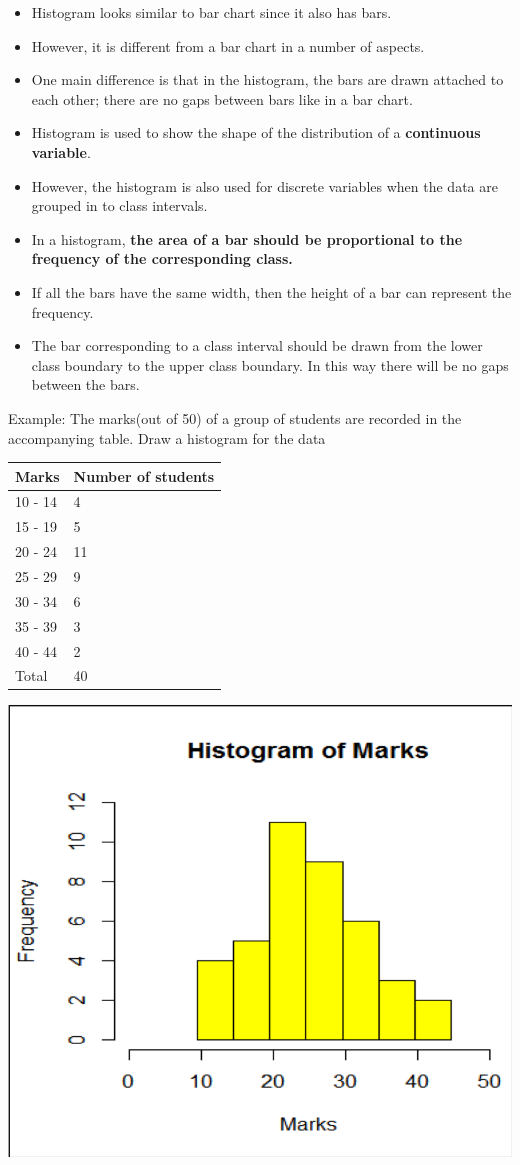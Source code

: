 \documentclass[]{book}
\providecommand{\tightlist}{%
  \setlength{\itemsep}{0pt}\setlength{\parskip}{0pt}}
\begin{document}
\begin{itemize}
\tightlist
\item
  Histogram looks similar to bar chart since it also has bars.
\item
  However, it is different from a bar chart in a number of aspects.
\item
  One main difference is that in the histogram, the bars are drawn attached to each other; there are no gaps between bars like in a bar chart.
\item
  Histogram is used to show the shape of the distribution of a \textbf{continuous variable}.
\item
  However, the histogram is also used for discrete variables when the data are grouped in to class intervals.
\item
  In a histogram, \textbf{the area of a bar should be proportional to the frequency of the corresponding class.}
\item
  If all the bars have the same width, then the height of a bar can represent the frequency.
\item
  The bar corresponding to a class interval should be drawn from the lower class boundary to the upper class boundary. In this way there will be no gaps between the bars.
\end{itemize}

Example: The marks(out of 50) of a group of students are recorded in the accompanying table. Draw a histogram for the data

\begin{longtable}[]{@{}ll@{}}
\toprule
Marks & Number of students\tabularnewline
\midrule
\endhead
10 - 14 & 4\tabularnewline
15 - 19 & 5\tabularnewline
20 - 24 & 11\tabularnewline
25 - 29 & 9\tabularnewline
30 - 34 & 6\tabularnewline
35 - 39 & 3\tabularnewline
40 - 44 & 2\tabularnewline
Total & 40\tabularnewline
\bottomrule
\end{longtable}

\begin{center}\includegraphics[width=1\linewidth]{figure/hist} \end{center}
\end{document}
